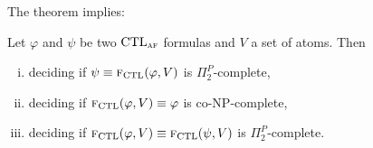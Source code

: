 \documentclass{article}
\begin{document}
%
%
%

The theorem implies:
\begin{corollary}
Let $\varphi$ and $\psi$ be two $\textrm{CTL}_{\textsc{a} \textsc{f}}$ formulas and $V$ a set of atoms. Then
\begin{enumerate}[(i)]
  \item deciding if $\psi \equiv {\textsc{f}_{\textrm{CTL}}}(\varphi, V)$ is $\Pi_2^P$-complete,
  \item deciding if ${\textsc{f}_{\textrm{CTL}}}(\varphi, V) \equiv \varphi$ is co-NP-complete,
  \item deciding if ${\textsc{f}_{\textrm{CTL}}}(\varphi, V) \equiv {\textsc{f}_{\textrm{CTL}}}(\psi, V)$ is $\Pi_2^P$-complete.
\end{enumerate}
\end{corollary}
\end{document}
